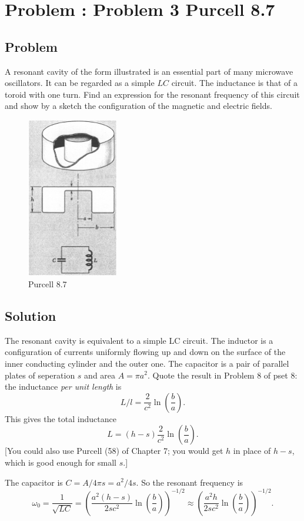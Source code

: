 \documentclass[solutions]{esg8022pset}
\begin{document}
\section{Problem \thesection: Problem 3 Purcell 8.7}
\subsection{Problem}
 A resonant cavity of the form illustrated is an essential part of many microwave oscillators. It can be regarded as a simple $LC$ circuit. The inductance is that of a toroid with one turn. Find an expression for the resonant frequency of this circuit and show by a sketch the configuration of the magnetic and electric fields.
 \begin{figure}[H]
    \centering
    \includegraphics[width = 4cm]{pu807}
    \caption{Purcell 8.7}
    \label{fig:cavity2}
  \end{figure}

\subsection{Solution}

The resonant cavity is equivalent to a simple LC circuit.  The
inductor is a configuration of currents uniformly flowing up and down
on the surface of the inner conducting cylinder and the outer one.
The capacitor is a pair of parallel plates of seperation $s$ and area
$A=\pi a^2$.  Quote the result in Problem 8 of pset 8: the inductance
{\sl per unit length} is
\[ L/l =\frac{2}{c^2}\ln{(\frac{b}{a})}.\]
This gives the total inductance
\[ L= (h-s)\frac{2}{c^2}\ln{(\frac{b}{a})}.\]
[You could also use Purcell (58) of Chapter 7; you would get $h$ in place of $h-s$, which is good enough
for small $s$.]

The capacitor is $C= A/4\pi s= a^2/4s$.  So the resonant frequency is
\begin{equation}
\omega_0=\frac{1}{\sqrt{LC}}= \left(\frac{a^2
(h-s)}{2sc^2}\ln(\frac{b}{a})\right)^{-1/2}
\approx  \left(\frac{a^2
h}{2sc^2}\ln(\frac{b}{a})\right)^{-1/2}.
\end{equation}
\end{document}
